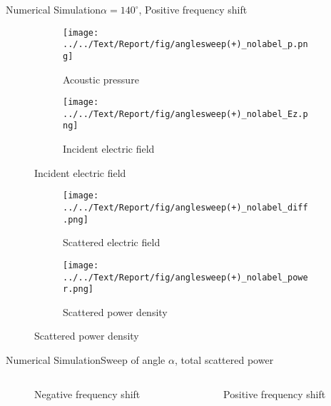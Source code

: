 \documentclass[11pt, final]{beamer}
\begin{document}
	\begin{frame}{Numerical Simulation}{$\alpha = 140^\circ$, Positive frequency shift}
		\begin{figure}
			\centering
			\begin{subfigure}[t]{0.5\textheight}
				\vspace{-1cm}
				\caption*{\hspace{0.5cm}Acoustic pressure}
				\vspace{-0.2cm}
				\texttt{[image: ../../Text/Report/fig/anglesweep(+)\_nolabel\_p.png]}
			\end{subfigure}
			\begin{subfigure}[t]{0.5\textheight}
				\vspace{-1cm}
				\caption*{\hspace{0.5cm}Incident electric field}
				\vspace{-0.2cm}
				\texttt{[image: ../../Text/Report/fig/anglesweep(+)\_nolabel\_Ez.png]}
			\end{subfigure}
		\end{figure}
		
		\begin{figure}
			\centering
			\vspace{-0.4cm}
			\begin{subfigure}[t]{0.5\textheight}
				\texttt{[image: ../../Text/Report/fig/anglesweep(+)\_nolabel\_diff.png]}
				\vspace{-0.1cm}
				\caption*{\hspace{0.5cm}Scattered electric field}
			\end{subfigure}
			\begin{subfigure}[t]{0.5\textheight}
				\texttt{[image: ../../Text/Report/fig/anglesweep(+)\_nolabel\_power.png]}
				\vspace{-0.1cm}
				\caption*{\hspace{0.5cm}Scattered power density}
			\end{subfigure}
		\end{figure}
	\end{frame}
	
	\begin{frame}{Numerical Simulation}{Sweep of angle $\alpha$, total scattered power}
		\begin{columns}
			\begin{column}{0.5\textwidth}
				\begin{figure}
					\centering
					\resizebox{\textwidth}{!}{}
					\caption*{Negative frequency shift}
				\end{figure}
			\end{column}
			\begin{column}{0.5\textwidth}
				\begin{figure}
					\centering
					\resizebox{\textwidth}{!}{}
					\caption*{Positive frequency shift}
				\end{figure}
			\end{column}
		\end{columns}
	\end{frame}
		
\end{document}
